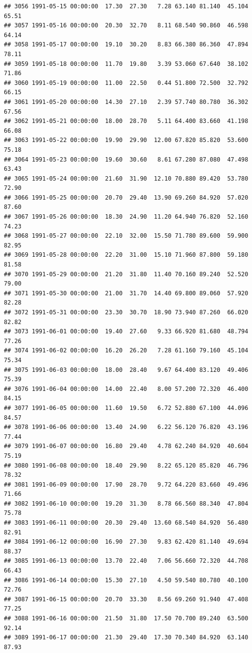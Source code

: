\documentclass{article}\usepackage{graphicx, color}
\makeatletter
\newenvironment{kframe}{%
 \def\at@end@of@kframe{}%
 \ifinner\ifhmode%
  \def\at@end@of@kframe{\end{minipage}}%
  \begin{minipage}{\columnwidth}%
 \fi\fi%
 \def\FrameCommand##1{\hskip\@totalleftmargin \hskip-\fboxsep
 \colorbox{shadecolor}{##1}\hskip-\fboxsep
     \hskip-\linewidth \hskip-\@totalleftmargin \hskip\columnwidth}%
 \MakeFramed {\advance\hsize-\width
   \@totalleftmargin\z@ \linewidth\hsize
   \@setminipage}}%
 {\par\unskip\endMakeFramed%
 \at@end@of@kframe}
\newenvironment{knitrout}{}{} %
\makeatother
\begin{document}
\begin{knitrout}
\begin{kframe}
\begin{verbatim}
## 3056 1991-05-15 00:00:00  17.30  27.30   7.28 63.140 81.140  45.104  65.51
## 3057 1991-05-16 00:00:00  20.30  32.70   8.11 68.540 90.860  46.598  64.14
## 3058 1991-05-17 00:00:00  19.10  30.20   8.83 66.380 86.360  47.894  78.11
## 3059 1991-05-18 00:00:00  11.70  19.80   3.39 53.060 67.640  38.102  71.86
## 3060 1991-05-19 00:00:00  11.00  22.50   0.44 51.800 72.500  32.792  66.15
## 3061 1991-05-20 00:00:00  14.30  27.10   2.39 57.740 80.780  36.302  67.56
## 3062 1991-05-21 00:00:00  18.00  28.70   5.11 64.400 83.660  41.198  66.08
## 3063 1991-05-22 00:00:00  19.90  29.90  12.00 67.820 85.820  53.600  75.18
## 3064 1991-05-23 00:00:00  19.60  30.60   8.61 67.280 87.080  47.498  63.43
## 3065 1991-05-24 00:00:00  21.60  31.90  12.10 70.880 89.420  53.780  72.90
## 3066 1991-05-25 00:00:00  20.70  29.40  13.90 69.260 84.920  57.020  87.60
## 3067 1991-05-26 00:00:00  18.30  24.90  11.20 64.940 76.820  52.160  74.23
## 3068 1991-05-27 00:00:00  22.10  32.00  15.50 71.780 89.600  59.900  82.95
## 3069 1991-05-28 00:00:00  22.20  31.00  15.10 71.960 87.800  59.180  81.58
## 3070 1991-05-29 00:00:00  21.20  31.80  11.40 70.160 89.240  52.520  79.00
## 3071 1991-05-30 00:00:00  21.00  31.70  14.40 69.800 89.060  57.920  82.28
## 3072 1991-05-31 00:00:00  23.30  30.70  18.90 73.940 87.260  66.020  82.82
## 3073 1991-06-01 00:00:00  19.40  27.60   9.33 66.920 81.680  48.794  77.26
## 3074 1991-06-02 00:00:00  16.20  26.20   7.28 61.160 79.160  45.104  75.34
## 3075 1991-06-03 00:00:00  18.00  28.40   9.67 64.400 83.120  49.406  75.39
## 3076 1991-06-04 00:00:00  14.00  22.40   8.00 57.200 72.320  46.400  84.15
## 3077 1991-06-05 00:00:00  11.60  19.50   6.72 52.880 67.100  44.096  84.57
## 3078 1991-06-06 00:00:00  13.40  24.90   6.22 56.120 76.820  43.196  77.44
## 3079 1991-06-07 00:00:00  16.80  29.40   4.78 62.240 84.920  40.604  75.19
## 3080 1991-06-08 00:00:00  18.40  29.90   8.22 65.120 85.820  46.796  78.32
## 3081 1991-06-09 00:00:00  17.90  28.70   9.72 64.220 83.660  49.496  71.66
## 3082 1991-06-10 00:00:00  19.20  31.30   8.78 66.560 88.340  47.804  75.78
## 3083 1991-06-11 00:00:00  20.30  29.40  13.60 68.540 84.920  56.480  82.91
## 3084 1991-06-12 00:00:00  16.90  27.30   9.83 62.420 81.140  49.694  88.37
## 3085 1991-06-13 00:00:00  13.70  22.40   7.06 56.660 72.320  44.708  66.43
## 3086 1991-06-14 00:00:00  15.30  27.10   4.50 59.540 80.780  40.100  72.76
## 3087 1991-06-15 00:00:00  20.70  33.30   8.56 69.260 91.940  47.408  77.25
## 3088 1991-06-16 00:00:00  21.50  31.80  17.50 70.700 89.240  63.500  92.14
## 3089 1991-06-17 00:00:00  21.30  29.40  17.30 70.340 84.920  63.140  87.93

\end{verbatim}
\end{kframe}
\end{knitrout}
\end{document}
